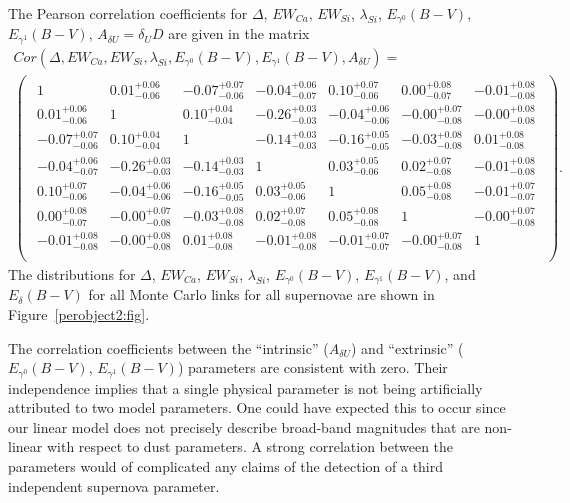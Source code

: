 \documentclass{aastex61}   	%
\begin{document}
The Pearson correlation coefficients for $\Delta$, $EW_{Ca}$, $EW_{Si}$, $\lambda_{Si}$, $E_{\gamma^0}(B-V)$, $E_{\gamma^1}(B-V)$,  $A_{\delta U}=\delta_U D$ are given in the matrix
\color{purple}
\begin{multline}
Cor(\Delta, EW_{Ca}, EW_{Si}, \lambda_{Si}, E_{\gamma^0}(B-V), E_{\gamma^1}(B-V),  A_{\delta U}) =\\
\begin{pmatrix}
\begin{array}{rrrrrrr}
1 & 0.01^{+0.06}_{-0.06} & -0.07^{+0.07}_{-0.06} & -0.04^{+0.06}_{-0.07} & 0.10^{+0.07}_{-0.06} & 0.00^{+0.08}_{-0.07} & -0.01^{+0.08}_{-0.08} \\
0.01^{+0.06}_{-0.06} & 1 & 0.10^{+0.04}_{-0.04} & -0.26^{+0.03}_{-0.03} & -0.04^{+0.06}_{-0.06} & -0.00^{+0.07}_{-0.08} & -0.00^{+0.08}_{-0.08} \\
-0.07^{+0.07}_{-0.06} & 0.10^{+0.04}_{-0.04} & 1 & -0.14^{+0.03}_{-0.03} & -0.16^{+0.05}_{-0.05} & -0.03^{+0.08}_{-0.08} & 0.01^{+0.08}_{-0.08} \\
-0.04^{+0.06}_{-0.07} & -0.26^{+0.03}_{-0.03} & -0.14^{+0.03}_{-0.03} & 1 & 0.03^{+0.05}_{-0.06} & 0.02^{+0.07}_{-0.08} & -0.01^{+0.08}_{-0.08} \\
0.10^{+0.07}_{-0.06} & -0.04^{+0.06}_{-0.06} & -0.16^{+0.05}_{-0.05} & 0.03^{+0.05}_{-0.06} & 1 & 0.05^{+0.08}_{-0.08} & -0.01^{+0.07}_{-0.07} \\
0.00^{+0.08}_{-0.07} & -0.00^{+0.07}_{-0.08} & -0.03^{+0.08}_{-0.08} & 0.02^{+0.07}_{-0.08} & 0.05^{+0.08}_{-0.08} & 1 & -0.00^{+0.07}_{-0.08} \\
-0.01^{+0.08}_{-0.08} & -0.00^{+0.08}_{-0.08} & 0.01^{+0.08}_{-0.08} & -0.01^{+0.08}_{-0.08} & -0.01^{+0.07}_{-0.07} & -0.00^{+0.07}_{-0.08} & 1 \\
\end{array}
\end{pmatrix}.
\end{multline}
\color{black}
The distributions for $\Delta$, $EW_{Ca}$, $EW_{Si}$, $\lambda_{Si}$, $E_{\gamma^0}(B-V)$, 
$E_{\gamma^1}(B-V)$, and
$E_{\delta}(B-V)$ for all Monte Carlo links for all supernovae are shown in Figure~\ref{perobject2:fig}.

The correlation coefficients between the ``intrinsic''  ($A_{\delta U}$) and ``extrinsic''
($E_{\gamma^0}(B-V)$, $E_{\gamma^1}(B-V)$)  parameters are
\color{purple}
consistent with zero.
Their independence implies that a single physical parameter is not being artificially attributed to two
model parameters.  One could have expected this to occur since our linear model does not precisely
describe broad-band magnitudes that are non-linear with respect to dust parameters. A strong
correlation between the parameters would of complicated any claims of the detection of a third independent supernova parameter.
\color{black}
\end{document}
